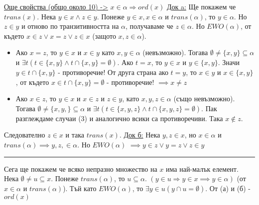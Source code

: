 \documentclass[fleqn, titlepage, 12pt]{report}
\begin{document}
\underline{Още свойства (общо около 10) ->}
\bigbreak
{} $ x \in \alpha \Rightarrow ord(x) $
\bigbreak
\underline{Док a:} Ще покажем че $ trans(x) $. Нека $ y \in x \land z \in y $. Понеже $ y \in x, x \in \alpha $ и
$ trans(\alpha) $, то $ y \in \alpha $. Но $ z \in y  $ и отново по транзитивността на $ \alpha $, получаваме че
$ z \in \alpha $. Но $ EWO(\alpha) $, от където $ x \in z \lor x = z \lor z \in x$ (защото $ x,z \in \alpha $).
\begin{itemize}
  \item Ако $ x = z $, то $ y \in x $ и $ x \in y $ като $ x,y \in \alpha $ (невъзможно).
    Тогава $ \emptyset \neq \{ x,y \} \subseteq \alpha $ и
    $ \exists{t}(t \in \{ x,y \} \land t \cap \{ x,y \} = \emptyset) $. Ако $ t = x $, то $ y \in x $ и
    $ y \in \{ x,y \} $. Значи $ y \in t \cap \{ x,y \} $ - противоречие! От друга страна ако $ t = y $, то
    $ x \in y $ и $ x \in \{ x,y \} $, от където $ x \in t \cap \{ x,y \} = \emptyset $ - противоречие!
    $ \implies x \neq z$
  \item Ако $ x \in z $, то $ y \in x $ и $ x \in z $ и $ z \in y $, като $ x,y,z \in \alpha $ (също невъзможно).
    Тогава $ \emptyset \neq \{ x,y, \} \subseteq \alpha $ и
    $ \exists{t}(t \in \{ x,y,z \} \land t \cap \{ x,y,z \} = \emptyset) $. Пак разглеждаме случаи (3) и аналогично
    всики са противоречиви. Така $ x \notin z $.
\end{itemize}

Следователно $ z \in x $ и така $ trans(x) $.
\bigbreak
\underline{Док б:} Нека $ y,z \in x $, но $ x \in \alpha $ и $ trans(\alpha) \implies y,z, \in \alpha$. Но $ EWO(\alpha) $
$ \implies y \in z \lor y = z \lor z \in y $
\bigbreak
\hrule
\bigbreak

Сега ще покажем че всяко непразно множество на $ x $ има най-малък елемент. Нека $ \emptyset \neq u \subseteq x $.
Понеже $ trans(\alpha) $, то $ u \subseteq \alpha $. $ (y \in u \Rightarrow y \in x \implies y \in \alpha) $
(от $ x \in \alpha $ и $ trans(\alpha) $). Тъй като $ EWO(\alpha) $, то $ \exists{y \in u}(y \cap u = \emptyset) $.
От (а) и (б) - $ ord(x) $
\bigbreak
\end{document}
